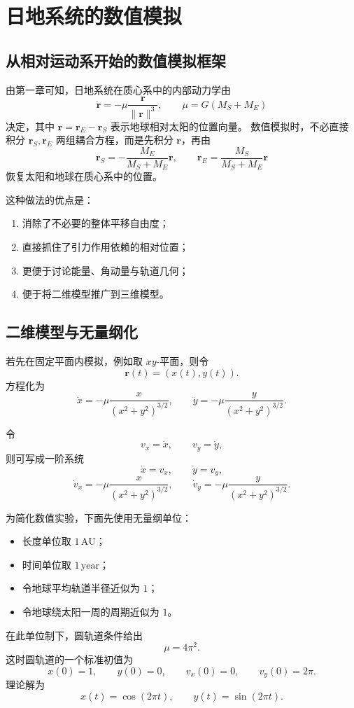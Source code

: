 \chapter{日地系统的数值模拟}

\section{从相对运动系开始的数值模拟框架}

由第一章可知，日地系统在质心系中的内部动力学由
\[
\ddot{\bm r}=-\mu \frac{\bm r}{\|\bm r\|^3},
\qquad
\mu=G(M_S+M_E)
\]
决定，其中 \(\bm r=\bm r_E-\bm r_S\) 表示地球相对太阳的位置向量。
数值模拟时，不必直接积分 \(\bm r_S,\bm r_E\) 两组耦合方程，而是先积分 \(\bm r\)，再由
\[
\bm r_S=-\frac{M_E}{M_S+M_E}\bm r,
\qquad
\bm r_E=\frac{M_S}{M_S+M_E}\bm r
\]
恢复太阳和地球在质心系中的位置\cite{MurrayDermott1999,BateMuellerWhite1971}。

这种做法的优点是：
\begin{enumerate}[label=\arabic*.]
  \item 消除了不必要的整体平移自由度；
  \item 直接抓住了引力作用依赖的相对位置；
  \item 更便于讨论能量、角动量与轨道几何；
  \item 便于将二维模型推广到三维模型。
\end{enumerate}

\section{二维模型与无量纲化}

若先在固定平面内模拟，例如取 \(xy\)-平面，则令
\[
\bm r(t)=(x(t),y(t)).
\]
方程化为\cite{BateMuellerWhite1971}
\begin{equation}\label{eq:2d-second}
\ddot x=-\mu \frac{x}{(x^2+y^2)^{3/2}},
\qquad
\ddot y=-\mu \frac{y}{(x^2+y^2)^{3/2}}.
\end{equation}

令
\[
v_x=\dot x,\qquad v_y=\dot y,
\]
则可写成一阶系统
\begin{equation}\label{eq:2d-first}
\dot x=v_x,\qquad \dot y=v_y,
\end{equation}
\begin{equation}\label{eq:2d-first-2}
\dot v_x=-\mu \frac{x}{(x^2+y^2)^{3/2}},
\qquad
\dot v_y=-\mu \frac{y}{(x^2+y^2)^{3/2}}.
\end{equation}

为简化数值实验，下面先使用无量纲单位：
\begin{itemize}
  \item 长度单位取 \(1\,\mathrm{AU}\)；
  \item 时间单位取 \(1\,\mathrm{year}\)；
  \item 令地球平均轨道半径近似为 \(1\)；
  \item 令地球绕太阳一周的周期近似为 \(1\)。
\end{itemize}
在此单位制下，圆轨道条件给出
\[
\mu=4\pi^2.
\]
这时圆轨道的一个标准初值为
\begin{equation}\label{eq:circular-ic}
x(0)=1,\qquad y(0)=0,\qquad v_x(0)=0,\qquad v_y(0)=2\pi.
\end{equation}
理论解为
\[
x(t)=\cos(2\pi t),\qquad y(t)=\sin(2\pi t).
\]

